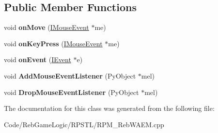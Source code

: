 \subsection*{Public Member Functions}
\begin{DoxyCompactItemize}
\item 
void {\bfseries on\+Move} (\hyperlink{class_i_mouse_event}{I\+Mouse\+Event} $\ast$me)\hypertarget{class_reb_w_a_e_m___reb_mouse_event_listener___p_adapter_ab2b27746482b82fa8d3ef1df121b1ef5}{}\label{class_reb_w_a_e_m___reb_mouse_event_listener___p_adapter_ab2b27746482b82fa8d3ef1df121b1ef5}

\item 
void {\bfseries on\+Key\+Press} (\hyperlink{class_i_mouse_event}{I\+Mouse\+Event} $\ast$me)\hypertarget{class_reb_w_a_e_m___reb_mouse_event_listener___p_adapter_a513b42c6eb56def6fbcc9be8c3174095}{}\label{class_reb_w_a_e_m___reb_mouse_event_listener___p_adapter_a513b42c6eb56def6fbcc9be8c3174095}

\item 
void {\bfseries on\+Event} (\hyperlink{class_i_event}{I\+Event} $\ast$e)\hypertarget{class_reb_w_a_e_m___reb_mouse_event_listener___p_adapter_a29af42be29b0b8e102174b5ef028a84e}{}\label{class_reb_w_a_e_m___reb_mouse_event_listener___p_adapter_a29af42be29b0b8e102174b5ef028a84e}

\item 
void {\bfseries Add\+Mouse\+Event\+Listener} (Py\+Object $\ast$mel)\hypertarget{class_reb_w_a_e_m___reb_mouse_event_listener___p_adapter_a72737d8fbdb24c6edd45517dca393fa5}{}\label{class_reb_w_a_e_m___reb_mouse_event_listener___p_adapter_a72737d8fbdb24c6edd45517dca393fa5}

\item 
void {\bfseries Drop\+Mouse\+Event\+Listener} (Py\+Object $\ast$mel)\hypertarget{class_reb_w_a_e_m___reb_mouse_event_listener___p_adapter_adf250b85186a8856e07ec8a4b36b16d0}{}\label{class_reb_w_a_e_m___reb_mouse_event_listener___p_adapter_adf250b85186a8856e07ec8a4b36b16d0}

\end{DoxyCompactItemize}


The documentation for this class was generated from the following file\+:\begin{DoxyCompactItemize}
\item 
Code/\+Reb\+Game\+Logic/\+R\+P\+S\+T\+L/R\+P\+M\+\_\+\+Reb\+W\+A\+E\+M.\+cpp\end{DoxyCompactItemize}
